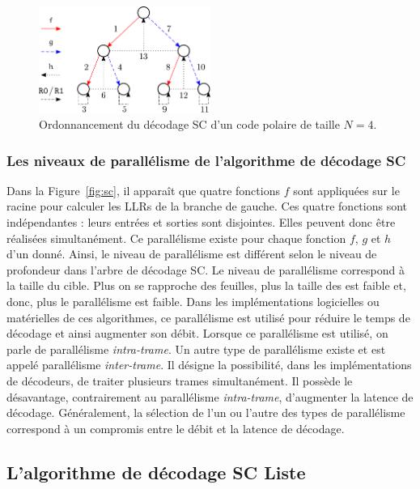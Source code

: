 \begin{figure}[t]
\centering
\includegraphics[width=0.5\textwidth]{main/ch1_fig/seq_sc}
\caption{Ordonnancement du décodage SC d'un code polaire de taille $N=4$.}
\label{fig:seq_sc}
\end{figure}

\subsubsection{Les niveaux de parallélisme de l'algorithme  de décodage SC}
\label{subsubsec:parallel}
Dans la Figure~\ref{fig:sc}, il apparaît que quatre fonctions $f$ sont appliquées sur le \noeud racine pour calculer les LLRs de la branche de gauche. Ces quatre fonctions sont indépendantes : leurs entrées et sorties sont disjointes. Elles peuvent donc être réalisées simultanément. Ce parallélisme existe pour chaque fonction $f$, $g$ et $h$ d'un \noeud donné. Ainsi, le niveau de parallélisme est différent selon le niveau de profondeur dans l'arbre de décodage SC. Le niveau de parallélisme correspond à la taille du \noeud cible. Plus on se rapproche des feuilles, plus la taille des \noeuds est faible et, donc, plus le parallélisme est faible. Dans les implémentations logicielles ou matérielles de ces algorithmes, ce parallélisme est utilisé pour réduire le temps de décodage et ainsi augmenter son débit. Lorsque ce parallélisme est utilisé, on parle de parallélisme \textit{intra-trame}. Un autre type de parallélisme existe et est appelé parallélisme \textit{inter-trame}. Il désigne la possibilité, dans les implémentations de décodeurs, de traiter plusieurs trames simultanément. Il possède le désavantage, contrairement au parallélisme \textit{intra-trame}, d'augmenter la latence de décodage. Généralement, la sélection de l'un ou l'autre des types de parallélisme correspond à un compromis entre le débit et la latence de décodage.


\subsection{L'algorithme de décodage SC Liste}
